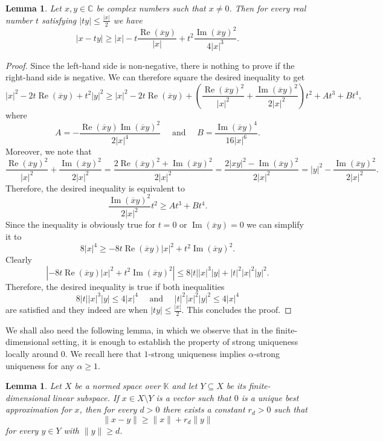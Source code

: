 \documentclass[12pt, reqno]{amsart}
\newtheorem{lem}[twr]{Lemma}
\theoremstyle{definition}
\theoremstyle{remark}
\numberwithin{equation}{section}
\DeclareMathOperator{\re}{Re}
\DeclareMathOperator{\im}{Im}
\begin{document}
\begin{lem}
\label{ineqcompl2}
Let $x, y \in \mathbb{C}$ be complex numbers such that $x \neq 0$. Then for every real number $t$ satisfying $|ty| \leq \frac{|x|}{2}$  we have
$$|x-ty| \geq |x| - t \frac{\re(\overline{x}y)}{|x|} + t^2 \frac{\im(\overline{x}y)^2}{4|x|^3}.$$
\end{lem}

\begin{proof}
Since the left-hand side is non-negative, there is nothing to prove if the right-hand side is negative. We can therefore square the desired inequality to get
$$|x|^2 - 2t \re(\overline{x}y) + t^2|y|^2 \geq |x|^2 - 2t \re(\overline{x}y) + \left ( \frac{\re(\overline{x}y)^2}{|x|^2} + \frac{\im(\overline{x}y)^2}{2|x|^2} \right ) t^2 + At^3 + Bt^4,$$
where
$$A= - \frac{\re(\overline{x}y)\im(\overline{x}y)^2}{2|x|^4} \quad \text{ and } \quad B=\frac{\im(\overline{x}y)^4}{16|x|^6}.$$
Moreover, we note that 
$$\frac{\re(\overline{x}y)^2}{|x|^2} + \frac{\im(\overline{x}y)^2}{2|x|^2} = \frac{2\re(\overline{x}y)^2 + \im(\overline{x}y)^2}{2|x|^2} = \frac{ 2|xy|^2 - \im(\overline{x}y)^2}{2|x|^2} = |y|^2 - \frac{\im(\overline{x}y)^2}{2|x|^2}.$$
Therefore, the desired inequality is equivalent to
$$\frac{\im(\overline{x}y)^2}{2|x|^2}t^2 \geq At^3 + Bt^4.$$
Since the inequality is obviously true for $t=0$ or $\im(\overline{x}y)=0$ we can simplify it to
$$8|x|^4 \geq -8t \re(\overline{x}y)|x|^2 + t^2 \im(\overline{x}y)^2.$$
Clearly
$$\left | -8t \re(\overline{x}y)|x|^2 + t^2 \im(\overline{x}y)^2 \right | \leq 8|t||x|^3|y| + |t|^2|x|^2|y|^2.$$
Therefore, the desired inequality is true if both inequalities
$$8|t||x|^3|y| \leq 4|x|^4 \quad \text{ and } \quad |t|^2|x|^2|y|^2 \leq 4|x|^4$$
are satisfied and they indeed are when $|ty| \leq \frac{|x|}{2}$. This concludes the proof.
\end{proof}

We shall also need the following lemma, in which we observe that in the finite-dimensional setting, it is enough to establish the property of strong uniqueness locally around $0$. We recall here that $1$-strong uniqueness implies $\alpha$-strong uniqueness for any $\alpha \geq 1$.

\begin{lem}
\label{lemcompact}
Let $X$ be a normed space over $\mathbb{K}$ and let $Y \subseteq X$ be its finite-dimensional linear subspace. If $x \in X \setminus Y$ is a vector such that $0$ is a unique best approximation for $x$, then for every $d>0$ there exists a constant $r_d>0$ such that
$$\|x-y\| \geq \|x\| + r_d\|y\|$$
for every $y \in Y$ with $\|y\| \geq d$.
\end{lem}
\end{document}
